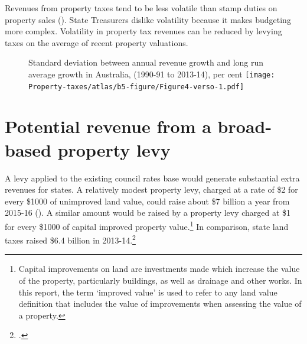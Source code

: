 \documentclass[twoside,english]{Dianab5ona4portrait}
\begin{document}
Revenues from property taxes tend to be less volatile than stamp duties on property sales (). State Treasurers dislike volatility because it makes budgeting more complex. Volatility in property tax revenues can be reduced by levying taxes on the average of recent property valuations. 

\begin{figure}
%
{Standard deviation between annual revenue growth and long run average growth in Australia, (1990-91 to 2013-14), per cent}
\texttt{[image: Property-taxes/atlas/b5-figure/Figure4-verso-1.pdf]}

\end{figure}
\section{Potential revenue from a broad-based property levy\label{sec:PROP-3-3}}
A levy applied to the existing council rates base would generate substantial extra revenues for states. A relatively modest property levy, charged at a rate of \$2 for every \$1000 of unimproved land value, could raise about \$7 billion a year from 2015-16 (). A similar amount would be raised by a property levy charged at \$1 for every \$1000 of capital improved property value.\footnote{Capital improvements on land are investments made which increase the value of the property, particularly buildings, as well as drainage and other works. In this report, the term ‘improved value’ is used to refer to any land value definition that includes the value of improvements when assessing the value of a property.}   In comparison, state land taxes raised \$6.4 billion in 2013-14.\footcite{ABS2015h} 
\end{document}
